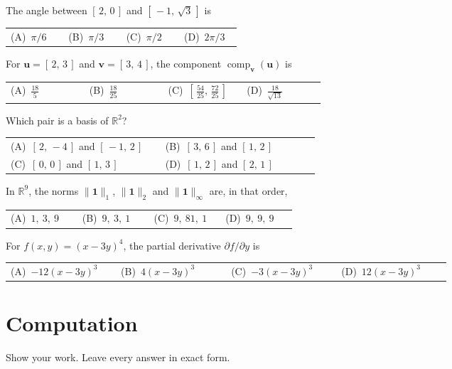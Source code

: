 \documentclass[11pt]{article}
\makeatletter
\newcommand{\fourch}[4]{\par\smallskip\noindent
  \begin{tabular}{@{}*{4}{>{\raggedright\arraybackslash}p{0.22\linewidth}}@{}}
  (A)\ #1 & (B)\ #2 & (C)\ #3 & (D)\ #4
  \end{tabular}\par}
\newcommand{\twoch}[4]{\par\smallskip\noindent
  \begin{tabular}{@{}*{2}{>{\raggedright\arraybackslash}p{0.46\linewidth}}@{}}
  (A)\ #1 & (B)\ #2 \\[6pt]
  (C)\ #3 & (D)\ #4
  \end{tabular}\par}
\newcommand{\R}{\mathbb{R}}
\newcommand{\vc}[1]{\mathbf{#1}}
\newcommand{\one}{\mathbf{1}}
\newcommand{\norm}[1]{\lVert #1\rVert}
\newcommand{\comp}[2]{\operatorname{comp}_{#1}(#2)}
\makeatother
\begin{document}
\newpage
\begin{tfitems}[start=4]
  \item The angle between $[\,2,\,0\,]$ and $[\,-1,\,\sqrt3\,]$ is
        \fourch{$\pi/6$}{$\pi/3$}{$\pi/2$}{$2\pi/3$}
        \vfill
  \item For $\vc{u}=[\,2,\,3\,]$ and $\vc{v}=[\,3,\,4\,]$, the component
        $\comp{\vc{v}}{\vc{u}}$ is
        \fourch{$\tfrac{18}{5}$}{$\tfrac{18}{25}$}
               {$[\,\tfrac{54}{25},\,\tfrac{72}{25}\,]$}
               {$\tfrac{18}{\sqrt{13}}$}
        \vfill
  \item Which pair is a basis of $\R^{2}$?
        \twoch{$[\,2,\,-4\,]$ and $[\,-1,\,2\,]$}
              {$[\,3,\,6\,]$ and $[\,1,\,2\,]$}
              {$[\,0,\,0\,]$ and $[\,1,\,3\,]$}
              {$[\,1,\,2\,]$ and $[\,2,\,1\,]$}
        \vfill
\end{tfitems}

\newpage
\begin{tfitems}[start=7]
  \item In $\R^{9}$, the norms $\norm{\one}_1$, $\norm{\one}_2$ and
        $\norm{\one}_\infty$ are, in that order,
        \fourch{$1,\ 3,\ 9$}{$9,\ 3,\ 1$}{$9,\ 81,\ 1$}{$9,\ 9,\ 9$}
        \vfill
  \item For $f(x,y)=(x-3y)^{4}$, the partial derivative
        $\partial f/\partial y$ is
        \fourch{$-12(x-3y)^{3}$}{$4(x-3y)^{3}$}{$-3(x-3y)^{3}$}
               {$12(x-3y)^{3}$}
        \vfill
\end{tfitems}

\newpage
\section{Computation}
Show your work. Leave every answer in exact form.
\end{document}
